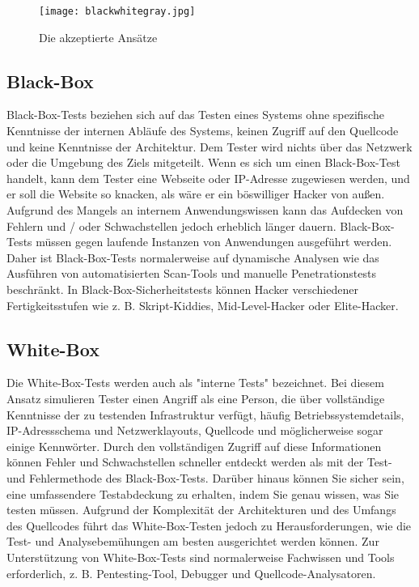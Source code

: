 \begin{figure}[h]
	\centering
	\texttt{[image: blackwhitegray.jpg]}
	\caption{Die akzeptierte Ansätze\cite{bwgtesting16}}
\end{figure}

\subsection{Black-Box}

Black-Box-Tests beziehen sich auf das Testen eines Systems ohne spezifische Kenntnisse der internen Abläufe des Systems, keinen Zugriff auf den Quellcode und keine Kenntnisse der Architektur\cite{bwgwebtesting07}. Dem Tester wird nichts über das Netzwerk oder die Umgebung des Ziels mitgeteilt\cite{tiller2004ethical}. Wenn es sich um einen Black-Box-Test handelt, kann dem Tester eine Webseite oder IP-Adresse zugewiesen werden, und er soll die Website so knacken, als wäre er ein böswilliger Hacker von außen\cite{whitaker2005penetration}. Aufgrund des Mangels an internem Anwendungswissen kann das Aufdecken von Fehlern und / oder Schwachstellen jedoch erheblich länger dauern. Black-Box-Tests müssen gegen laufende Instanzen von Anwendungen ausgeführt werden. Daher ist Black-Box-Tests normalerweise auf dynamische Analysen wie das Ausführen von automatisierten Scan-Tools und manuelle Penetrationstests beschränkt\cite{bwgwebtesting07}. In Black-Box-Sicherheitstests können Hacker verschiedener Fertigkeitsstufen wie z. B. Skript-Kiddies, Mid-Level-Hacker oder Elite-Hacker\cite{bwgprole18}.

\subsection{White-Box}

Die White-Box-Tests werden auch als "interne Tests" bezeichnet. Bei diesem Ansatz simulieren Tester einen Angriff als eine Person, die über vollständige Kenntnisse der zu testenden Infrastruktur verfügt, häufig Betriebssystemdetails, IP-Adressschema und Netzwerklayouts, Quellcode und möglicherweise sogar einige Kennwörter\cite{ali2011pt}. Durch den vollständigen Zugriff auf diese Informationen können Fehler und Schwachstellen schneller entdeckt werden als mit der Test- und Fehlermethode des Black-Box-Tests. Darüber hinaus können Sie sicher sein, eine umfassendere Testabdeckung zu erhalten, indem Sie genau wissen, was Sie testen müssen. Aufgrund der Komplexität der Architekturen und des Umfangs des Quellcodes führt das White-Box-Testen jedoch zu Herausforderungen, wie die Test- und Analysebemühungen am besten ausgerichtet werden können. Zur Unterstützung von White-Box-Tests sind normalerweise Fachwissen und Tools erforderlich, z. B. Pentesting-Tool, Debugger und Quellcode-Analysatoren\cite{bwgwebtesting07}.

